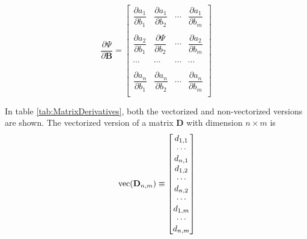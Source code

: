 \documentclass[]{article}
\def\BB{\mbox{$\mathbf B$}}	\def\bb{\mbox{$\mathbf b$}}
\def\DD{\mbox{$\mathbf D$}}	\def\dd{\mbox{$\mathbf d$}}
\def\vec{\,\textup{\textrm{vec}}}
\begin{document}
\begin{equation*}
\frac{\partial\Psi}{\partial\BB}=
\begin{bmatrix}
\dfrac{\partial a_1}{\partial b_1}& \dfrac{\partial a_1}{\partial b_2}& \cdots& \dfrac{\partial a_1}{\partial b_m}\\
\\
\dfrac{\partial a_2}{\partial b_1}& \dfrac{\partial\Psi}{\partial b_2}& \cdots& \dfrac{\partial a_2}{\partial b_m}\\
\\
\cdots&  \cdots&  \cdots&  \cdots\\
\\
\dfrac{\partial a_n}{\partial b_1}& \dfrac{\partial a_n}{\partial b_2}& \cdots& \dfrac{\partial a_n}{\partial b_m}\\
\end{bmatrix}
\end{equation*}  

In table \ref{tab:MatrixDerivatives}, both the vectorized and non-vectorized versions are shown. The vectorized version of a matrix $\DD$ with dimension $n \times m$ is
\begin{gather*}
\vec(\DD_{n,m})\equiv
\begin{bmatrix}
d_{1,1}\\
\cdots\\
d_{n,1}\\
d_{1,2}\\
\cdots\\
d_{n,2}\\
\cdots\\
d_{1,m}\\
\cdots\\
d_{n,m}
\end{bmatrix}\\
\end{gather*}
\end{document}

